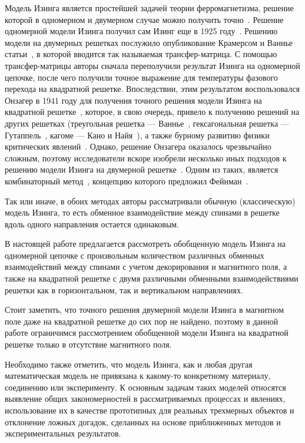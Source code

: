 Модель Изинга является простейшей задачей теории ферромагнетизма, решение которой в одномерном и двумерном случае можно получить точно~\cite{baxter1985}. Решение одномерной модели Изинга получил сам Изинг еще в 1925 году~\cite{ising1925}. Решению модели на двумерных решетках послужило опубликование Крамерсом и Ваннье статьи~\cite{kramers_wannier1, kramers_wannier2}, в которой вводится так называемая трансфер-матрица. С помощью трансфер-матрицы авторы сначала переполучили результат Изинга на одномерной цепочке, после чего получили точное выражение для температуры фазового перехода на квадратной решетке. Впоследствии, этим результатом воспользовался Онзагер в 1941 году для получения точного решения модели Изинга на квадратной решетке~\cite{onsager1941}, которое, в свою очередь, привело к получению решений на других решетках (треугольная решетка --- Ваннье~\cite{wannier1950}, гексагональная решетка --- Гутаппель~\cite{houtapell1950}, кагоме --- Кано и Найя~\cite{kano_naya1953}), а также бурному развитию физики критических явлений~\cite{yang1952, brush1967, mussardo2010}. Однако, решение Онзагера оказалось чрезвычайно сложным, поэтому исследователи вскоре изобрели несколько иных подходов к решению модели Изинга на двумерной решетке~\cite{kaufrman1949, hurst1960, kasteleyn1963}. Одним из таких, является комбинаторный метод~\cite{kac1952, montroll1953, vdovichenko1965}, концепцию которого предложил Фейнман~\cite{feynmann1978}. 

Так или иначе, в обоих методах авторы рассматривали обычную (классическую) модель Изинга, то есть обменное взаимодействие между спинами в решетке вдоль одного направления остается одинаковым. 

В настоящей работе предлагается рассмотреть обобщенную модель Изинга на одномерной цепочке с произвольным количеством различных обменных взаимодействий между спинами с учетом декорирования и магнитного поля, а также на квадратной решетке с двумя различными обменными взаимодействиями решетки как в горизонтальном, так и вертикальном направлениях.

Стоит заметить, что точного решения двумерной модели Изинга в магнитном поле даже на квадратной решетке до сих пор не найдено, поэтому в данной работе ограничимся рассмотрением обобщенной модели Изинга на квадратной решетке только в отсутствие магнитного поля.

Необходимо также отметить, что модель Изинга, как и любая другая математическая модель не привязана к какому-то конкретному материалу, соединению или эксперименту. К основным задачам таких моделей относятся выявление общих закономерностей в рассматриваемых процессах и явлениях, использование их в качестве прототипных для реальных трехмерных объектов и отклонение ложных догадок, сделанных на основе приближенных методов и экспериментальных результатов. 

